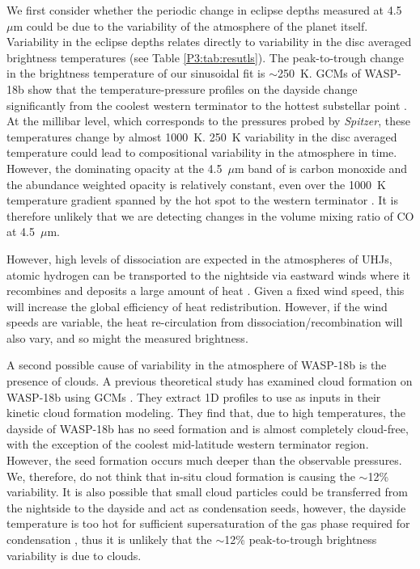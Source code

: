 We first consider whether the periodic change in eclipse depths measured at 4.5~$\mu$m could be due to the variability of the atmosphere of the planet itself. Variability in the eclipse depths relates directly to variability in the disc averaged brightness temperatures (see Table \ref{P3:tab:resutls}). The peak-to-trough change in the brightness temperature of our sinusoidal fit is $\sim$250~K. GCMs of WASP-18b show that the temperature-pressure profiles on the dayside change significantly from the coolest western terminator to the hottest substellar point \citet{Helling2019a}. At the millibar level, which corresponds to the pressures probed by \textit{Spitzer}, these temperatures change by almost 1000~K. 250~K variability in the disc averaged temperature could lead to compositional variability in the atmosphere in time. However, the dominating opacity at the 4.5~$\mu$m band of \spitzerIRAC is carbon monoxide and the abundance weighted opacity is relatively constant, even over the 1000~K temperature gradient spanned by the hot spot to the western terminator \citep[e.g.,][]{Moses2013a}. It is therefore unlikely that we are detecting changes in the volume mixing ratio of CO at 4.5~$\mu$m.


However, high levels of  dissociation are expected in the atmospheres of UHJs, atomic hydrogen can be transported to the nightside via eastward winds where it recombines and deposits a large amount of heat \citep{Komacek2018a, Bell2018}. Given a fixed wind speed, this will increase the global efficiency of heat redistribution. However, if the wind speeds are variable, the heat re-circulation from  dissociation/recombination will also vary, and so might the measured brightness.

A second possible cause of variability in the atmosphere of WASP-18b is the presence of clouds. A previous theoretical study has examined cloud formation on WASP-18b using GCMs \citep{Helling2019a}. They extract 1D profiles to use as inputs in their kinetic cloud formation modeling. They find that, due to high temperatures, the dayside of WASP-18b has no seed formation and is almost completely cloud-free, with the exception of the coolest mid-latitude western terminator region. However, the seed formation occurs much deeper than the observable pressures. We, therefore, do not think that in-situ cloud formation is causing the $\sim$12\% variability. It is also possible that small cloud particles could be transferred from the nightside to the dayside and act as condensation seeds, however, the dayside temperature is too hot for sufficient supersaturation of the gas phase required for condensation \citep{Helling2019a}, thus it is unlikely that the $\sim$12\% peak-to-trough brightness variability is due to clouds.

